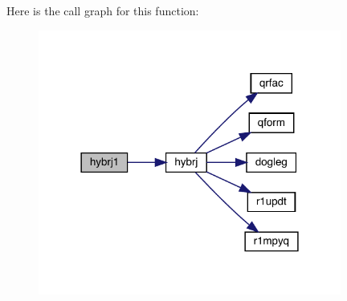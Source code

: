 Here is the call graph for this function\+:\nopagebreak
\begin{figure}[H]
\begin{center}
\leavevmode
\includegraphics[width=282pt]{minpack_8f95_afefee19843910dca7f59c228bf69749d_cgraph}
\end{center}
\end{figure}
\mbox{\label{minpack_8f95_a29cf549303bc0ced9cb2e1ef2da0234b}} 
